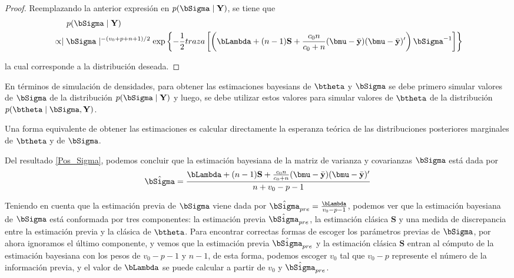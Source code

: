 \documentclass[10pt,openright]{book}\usepackage[]{graphicx}\usepackage[]{color}
\begin{document}
\begin{proof}
Reemplazando la anterior expresi\'on en $p(\bSigma\mid\mathbf{Y})$, se tiene que
\begin{align*}
&\ \ \ \ \ p(\bSigma\mid\mathbf{Y})\\
&\propto \mid\bSigma\mid^{-(v_0+p+n+1)/2}\exp\left\{-\frac{1}{2}traza\left[\left(\bLambda+(n-1)\mathbf{S}+\frac{c_0n}{c_0+n}(\bmu-\bar{\mathbf{y}})(\bmu-\bar{\mathbf{y}})'\right)\bSigma^{-1}\right]\right\}
\end{align*}

la cual corresponde a la distribuci\'on deseada.
\end{proof}

En t\'erminos de simulaci\'on de densidades, para obtener las estimaciones bayesians de $\btheta$ y $\bSigma$ se debe primero simular valores de $\bSigma$ de la distribuci\'on $p(\bSigma \mid \mathbf{Y})$ y luego, se debe utilizar estos valores para simular valores de $\btheta$ de la distribuci\'on $p(\btheta \mid \bSigma,\mathbf{Y})$.

Una forma equivalente de obtener las estimaciones es calcular directamente la esperanza te\'orica de las distribuciones posteriores marginales de $\btheta$ y de $\bSigma$. 

Del resultado \ref{Pos_Sigma}, podemos concluir que la estimaci\'on bayesiana de la matriz de varianza y covarianzas $\bSigma$ est\'a dada por
\begin{equation*}
\hat{\bSigma}=\dfrac{\bLambda+(n-1)\mathbf{S}+\frac{c_0n}{c_0+n}(\bmu-\bar{\mathbf{y}})(\bmu-\bar{\mathbf{y}})'}{n+v_0-p-1}
\end{equation*}

Teniendo en cuenta que la estimaci\'on previa de $\bSigma$ viene dada por $\hat{\bSigma}_{pre}=\frac{\bLambda}{v_0-p-1}$, podemos ver que la estimaci\'on bayesiana de $\bSigma$ est\'a conformada por tres componentes: la estimaci\'on previa $\hat{\bSigma}_{pre}$, la estimaci\'on cl\'asica $\mathbf{S}$ y una medida de discrepancia entre la estimaci\'on previa y la cl\'asica de $\btheta$. Para encontrar correctas formas de escoger los par\'ametros previas de $\bSigma$, por ahora ignoramos el \'ultimo componente, y vemos que la estimaci\'on previa $\hat{\bSigma}_{pre}$ y la estimaci\'on cl\'asica $\mathbf{S}$ entran al c\'omputo de la estimaci\'on bayesiana con los pesos de $v_0-p-1$ y $n-1$, de esta forma, podemos escoger $v_0$ tal que $v_0-p$ represente el n\'umero de la informaci\'on previa, y el valor de $\bLambda$ se puede calcular a partir de $v_0$ y $\hat{\bSigma}_{pre}$. 
\end{document}
